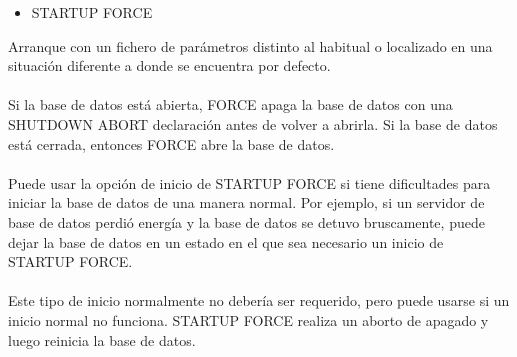 \begin{itemize}
	\item STARTUP FORCE  
\end{itemize}
\begin{adjustwidth}{0.40in}{0.0in}
	Arranque con un fichero de parámetros distinto al habitual o localizado en una situación diferente a donde se encuentra por defecto.\\ \\
	Si la base de datos está abierta, FORCE apaga la base de datos con una SHUTDOWN ABORT declaración antes de volver a abrirla. Si la base de datos está cerrada, entonces FORCE abre la base de datos.\\ \\
	Puede usar la opción de inicio de STARTUP FORCE si tiene dificultades para iniciar la base de datos de una manera normal. Por ejemplo, si un servidor de base de datos perdió energía y la base de datos se detuvo bruscamente, puede dejar la base de datos en un estado en el que sea necesario un inicio de STARTUP FORCE.\\ \\
	Este tipo de inicio normalmente no debería ser requerido, pero puede usarse si un inicio normal no funciona. STARTUP FORCE realiza un aborto de apagado y luego reinicia la base de datos.
\end{adjustwidth}

